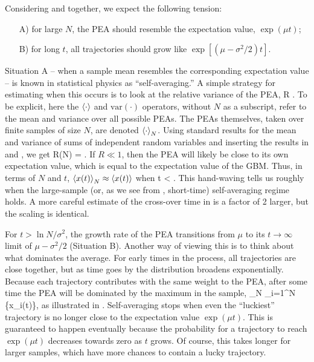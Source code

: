 Considering  and  together, we expect the following tension:
\begin{enumerate}
\item[A)] for large $N$, the PEA should resemble the expectation value, $\exp(\mu t)$;
\item[B)] for long $t$, all trajectories should grow like $\exp[(\mu-\sigma^2/2)t]$.
\end{enumerate}
Situation A -- when a sample mean resembles the corresponding expectation value -- is known in statistical physics as ``self-averaging.'' A simple strategy for estimating when this occurs is to look at the relative variance of the PEA,
\be
R \equiv {}.
\ee
To be explicit, here the $\left\langle\cdot \right\rangle$ and $\text{var}(\cdot)$ operators, 
without $N$ as a subscript, 
refer to the mean and variance over all possible PEAs. The PEAs themselves, taken over finite samples of size $N$, are denoted $\left\langle\cdot \right\rangle_N$. 
Using standard results for the mean and variance of sums of independent random variables and inserting the results in  and , we get
\be
R(N) = .
\ee
If $R \ll 1$, then the PEA will likely be close to its own expectation value, which is equal to the expectation value of the GBM. Thus, in terms of $N$ and $t$, $\left\langle x(t) \right\rangle_N\approx\left\langle x(t) \right\rangle$ when
\be
t < .
\ee
This hand-waving tells us roughly when the large-sample (or, as we see from , short-time) self-averaging regime holds. A more careful estimate of the cross-over time in  is a factor of 2 larger, but the scaling is identical.

For $t>\ln N/\sigma^2$, the growth rate of the PEA transitions from $\mu$ to its $t\to\infty$ limit of $\mu-\sigma^2/2$ (Situation B). 
Another way of viewing this is to think about what dominates the average. For early times in the process, all trajectories are close together, but as time goes by the distribution broadens exponentially. Because each trajectory contributes with the same weight to the PEA, after some time the PEA will be dominated by the maximum in the sample,
\be
{}_N \approx {}\max_{i=1}^N \{x_i(t)\},
\ee
as illustrated in .
Self-averaging stops when even the ``luckiest'' trajectory is no longer close to the expectation value $\exp(\mu t)$. This is guaranteed to happen eventually because the probability for a trajectory to reach $\exp(\mu t)$ decreases towards zero as $t$ grows. Of course, this takes longer for larger samples, which have more chances to contain a lucky trajectory. 

